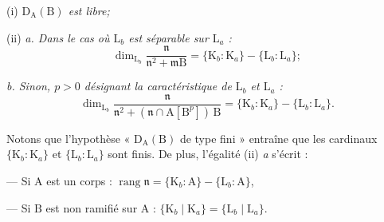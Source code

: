 (i) \textit{$\mathrm D_{\mathrm A}(\mathrm B)$ est libre;}

(ii) \textit{a. Dans le cas où $\mathrm L_b$ est séparable sur $\mathrm L_a$ :}
\[
\dim_{\mathrm L_b}\frac{\mathfrak n}{\mathfrak n^2+\mathfrak m\mathrm B}=\{\mathrm K_b:\mathrm K_a\}-\{\mathrm L_b:\mathrm L_a\};
\]

\textit{b. Sinon, $p>0$ désignant la caractéristique de $\mathrm L_b$ et $\mathrm L_a$ :}
\[
\dim_{\mathrm L_b}\frac{\mathfrak n}{\mathfrak n^2+(\mathfrak n\cap\mathrm A[\mathrm B^p])\,\mathrm B}=\{\mathrm K_b:\mathrm K_a\}-\{\mathrm L_b:\mathrm L_a\}.
\]

Notons que l’hypothèse « $\mathrm D_{\mathrm A}(\mathrm B)$ de type fini » entraîne que les cardinaux $\{\mathrm K_b:\mathrm K_a\}$ et $\{\mathrm L_b:\mathrm L_a\}$ sont finis. De plus, l’égalité (ii) \textit{a} s’écrit :

--- Si $\mathrm A$ est un corps : $\operatorname{rang}\mathfrak n=\{\mathrm K_b:\mathrm A\}-\{\mathrm L_b:\mathrm A\}$,

--- Si $\mathrm B$ est non ramifié sur $\mathrm A$ : $\{\mathrm K_b\mid\mathrm K_a\}=\{\mathrm L_b\mid\mathrm L_a\}$.
